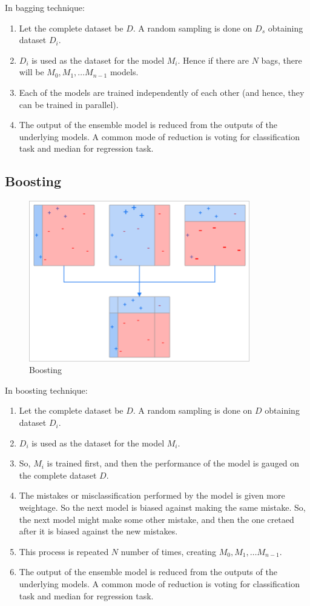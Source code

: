 In bagging technique:
\begin{enumerate}
    \item Let the complete dataset be $D$. A random sampling is done on $D_s$ obtaining dataset $D_i$.
    \item $D_i$ is used as the dataset for the model $M_i$. Hence if there are $N$ bags, there will be $M_0, M_1, \ldots M_{n - 1}$ models.
    \item Each of the models are trained independently of each other (and hence, they can be trained in parallel). 
    \item The output of the ensemble model is reduced from the outputs of the underlying models. A common mode of reduction is voting for classification task and median for regression task.
\end{enumerate}

\subsection{Boosting}

\begin{figure}[H]
\centering
\includegraphics[height=7cm]{Figures/boosting.png}
\caption{Boosting}
\label{fig23}
\end{figure}

In boosting technique:
\begin{enumerate}
    \item Let the complete dataset be $D$. A random sampling is done on $D$ obtaining dataset $D_i$.
    \item $D_i$ is used as the dataset for the model $M_i$.
    \item So, $M_i$ is trained first, and then the performance of the model is gauged on the complete dataset $D$.
    \item The mistakes or misclassification performed by the model is given more weightage. So the next model is biased against making the same mistake. So, the next model might make some other mistake, and then the one cretaed after it is biased against the new mistakes.
    \item This process is repeated $N$ number of times, creating $M_0, M_1, \ldots M_{n - 1}$.
    \item The output of the ensemble model is reduced from the outputs of the underlying models. A common mode of reduction is voting for classification task and median for regression task.
\end{enumerate}

